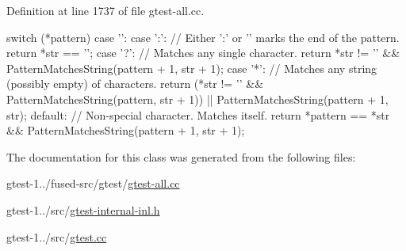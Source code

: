 \-Definition at line 1737 of file gtest-\/all.\-cc.


\begin{DoxyCode}
                                                            {
  switch (*pattern) {
    case '\0':
    case ':':  // Either ':' or '\0' marks the end of the pattern.
      return *str == '\0';
    case '?':  // Matches any single character.
      return *str != '\0' && PatternMatchesString(pattern + 1, str + 1);
    case '*':  // Matches any string (possibly empty) of characters.
      return (*str != '\0' && PatternMatchesString(pattern, str + 1)) ||
          PatternMatchesString(pattern + 1, str);
    default:  // Non-special character.  Matches itself.
      return *pattern == *str &&
          PatternMatchesString(pattern + 1, str + 1);
  }
}
\end{DoxyCode}


\-The documentation for this class was generated from the following files\-:\begin{DoxyCompactItemize}
\item 
gtest-\/1../fused-\/src/gtest/\hyperlink{fused-src_2gtest_2gtest-all_8cc}{gtest-\/all.\-cc}\item 
gtest-\/1../src/\hyperlink{gtest-internal-inl_8h}{gtest-\/internal-\/inl.\-h}\item 
gtest-\/1../src/\hyperlink{gtest_8cc}{gtest.\-cc}\end{DoxyCompactItemize}
